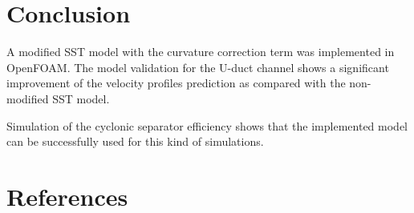\documentclass[a4paper]{jpconf}
\begin{document}
\section{Conclusion}
A modified SST model with the curvature correction term was implemented in OpenFOAM{\textregistered}. The model validation for the U-duct channel shows a significant improvement of the velocity profiles prediction as compared with the non-modified SST model.

Simulation of the cyclonic separator efficiency shows that the implemented model can be successfully used for this kind of simulations.

\section*{References}

\end{document}
